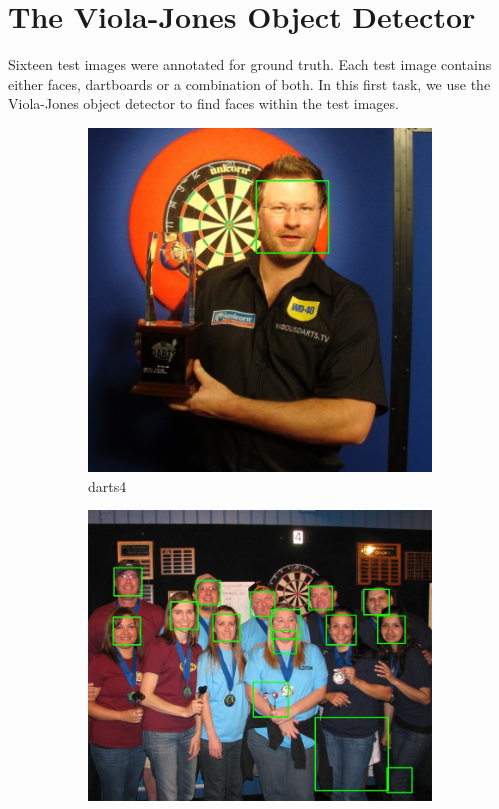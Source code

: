 \documentclass[conference]{IEEEtran}
\begin{document}
\section{The Viola-Jones Object Detector}
\vspace{-0.15cm}
Sixteen test images were annotated for ground truth. Each test image contains either faces, dartboards or a combination of both. In this first task, we use the Viola-Jones object detector to find faces within the test images. 
\begin{figure}[htb]
\centering
\begin{subfigure}{.5\linewidth}
  \centering
  \includegraphics[width=.9\linewidth]{images/detected0.jpg}
  \caption{darts4}
  \label{fig:sub1}
\end{subfigure}%
\begin{subfigure}{.5\linewidth}
  \centering
  \vspace{0.6cm}
  \includegraphics[width=.9\linewidth]{images/detected1.jpg}

\end{subfigure}
\end{figure}
\end{document}
